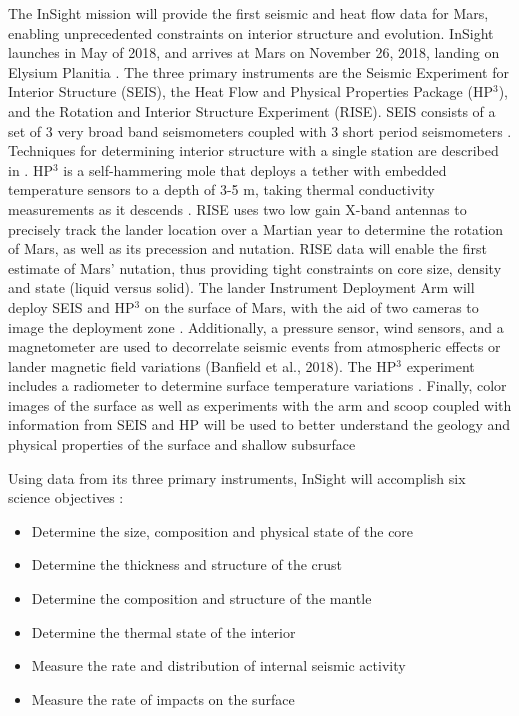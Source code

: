The InSight mission will provide the first seismic and heat flow data for Mars, enabling unprecedented constraints on interior structure and evolution.  InSight launches in May of 2018, and arrives at Mars on November 26, 2018, landing on Elysium Planitia \citep{Golombek2017}.  The three primary instruments are the Seismic Experiment for Interior Structure (SEIS), the Heat Flow and Physical Properties Package (HP$^3$), and the Rotation and Interior Structure Experiment (RISE).   SEIS consists of a set of 3 very broad band seismometers coupled with 3 short period seismometers \citep{Lognonne2018}. Techniques for determining interior structure with a single station are described in \citet{PANNING2015,BOSE2017}. HP$^3$ is a self-hammering mole that deploys a tether with embedded temperature sensors to a depth of 3-5 m, taking thermal conductivity measurements as it descends \citep{Spohn2018}.  RISE \citep{Folkner2018} uses two low gain X-band antennas to precisely track the lander location over a Martian year to determine the rotation of Mars, as well as its precession and nutation. RISE data will enable the first estimate of Mars’ nutation, thus providing tight constraints on core size, density and state (liquid versus solid).  The lander Instrument Deployment Arm \citep{Trebi-Ollennu2018} will deploy SEIS and HP$^3$ on the surface of Mars, with the aid of two cameras to image the deployment zone \citep{Maki2018}.  Additionally, a pressure sensor, wind sensors, and a magnetometer are used to decorrelate seismic events from atmospheric effects or lander magnetic field variations (Banfield et al., 2018). The HP$^3$ experiment includes a radiometer to determine surface temperature variations \citep{Spohn2018}. Finally, color images of the surface as well as experiments with the arm and scoop coupled with information from SEIS and HP will be used to better understand the geology and physical properties of the surface and shallow subsurface \citep{Golombek2018}


Using data from its three primary instruments, InSight will accomplish six science objectives \citep{Banerdt2013}:
\begin{itemize}
\item Determine the size, composition and physical state of the core
	\item Determine the thickness and structure of the crust
	\item Determine the composition and structure of the mantle
	\item Determine the thermal state of the interior
	\item Measure the rate and distribution of internal seismic activity
\item Measure the rate of impacts on the surface
\end{itemize}

